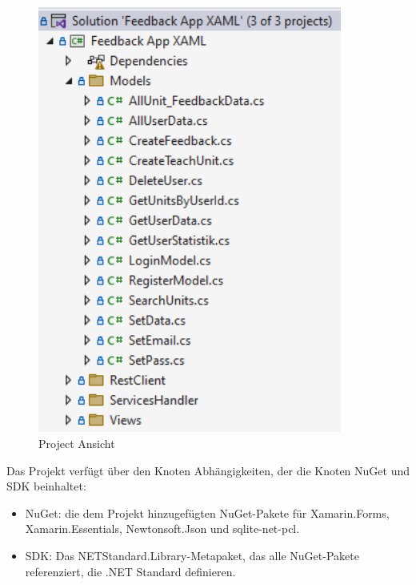 \begin{figure}[h]
    \begin{center}\includegraphics[width=10cm]{pics/Xamarin1.png}
    \caption[Project Ansicht]{Project Ansicht}
    \end{center}
\end{figure}

Das Projekt verfügt über den Knoten Abhängigkeiten, der die Knoten NuGet und SDK beinhaltet:
\begin{itemize}
        \item NuGet: die dem Projekt hinzugefügten NuGet-Pakete für Xamarin.Forms, Xamarin.Essentials, Newtonsoft.Json und sqlite-net-pcl.
        \item SDK: Das NETStandard.Library-Metapaket, das alle NuGet-Pakete referenziert, die .NET Standard definieren.
\end{itemize}
\newpage

